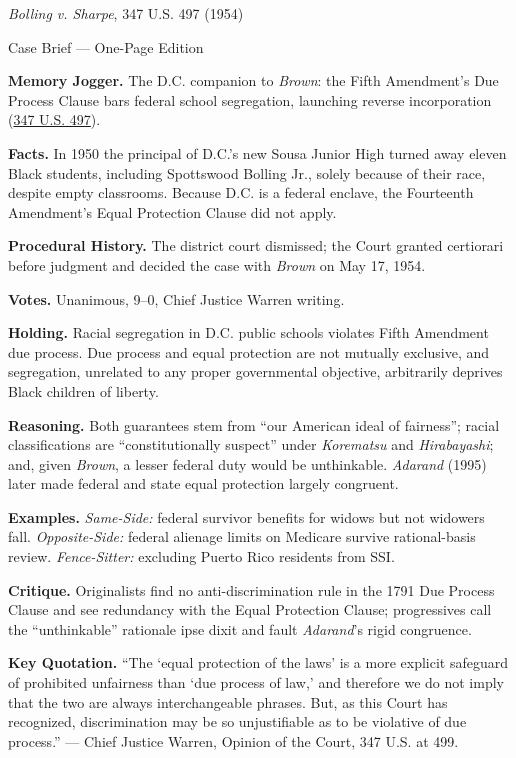 \documentclass[12pt]{article}
\begin{document}
\begin{center}
{\Large \textit{Bolling v. Sharpe}, 347 U.S. 497 (1954)\par}
\vspace{0.3em}
{\normalsize Case Brief --- One-Page Edition\par}
\end{center}

\textbf{Memory Jogger.} The D.C. companion to \textit{Brown}: the Fifth Amendment's Due Process Clause bars federal school segregation, launching reverse incorporation (\href{https://supreme.justia.com/cases/federal/us/347/497/}{347 U.S. 497}).

\textbf{Facts.} In 1950 the principal of D.C.'s new Sousa Junior High turned away eleven Black students, including Spottswood Bolling Jr., solely because of their race, despite empty classrooms. Because D.C. is a federal enclave, the Fourteenth Amendment's Equal Protection Clause did not apply.

\textbf{Procedural History.} The district court dismissed; the Court granted certiorari before judgment and decided the case with \textit{Brown} on May 17, 1954.

\textbf{Votes.} Unanimous, 9--0, Chief Justice Warren writing.

\textbf{Holding.} Racial segregation in D.C. public schools violates Fifth Amendment due process. Due process and equal protection are not mutually exclusive, and segregation, unrelated to any proper governmental objective, arbitrarily deprives Black children of liberty.

\textbf{Reasoning.} Both guarantees stem from ``our American ideal of fairness''; racial classifications are ``constitutionally suspect'' under \textit{Korematsu} and \textit{Hi\-ra\-ba\-ya\-shi}; and, given \textit{Brown}, a lesser federal duty would be unthinkable. \textit{Adarand} (1995) later made federal and state equal protection largely congruent.

\textbf{Examples.} \emph{Same-Side:} federal survivor benefits for widows but not widowers fall. \emph{Opposite-Side:} federal alienage limits on Medicare survive rational-basis review. \emph{Fence-Sitter:} excluding Puerto Rico residents from SSI.

\textbf{Critique.} Originalists find no anti-discrimination rule in the 1791 Due Process Clause and see redundancy with the Equal Protection Clause; progressives call the ``unthinkable'' rationale ipse dixit and fault \textit{Adarand}'s rigid congruence.

\textbf{Key Quotation.} ``The `equal protection of the laws' is a more explicit safeguard of prohibited unfairness than `due process of law,' and therefore we do not imply that the two are always interchangeable phrases. But, as this Court has recognized, discrimination may be so unjustifiable as to be violative of due process.'' --- Chief Justice Warren, Opinion of the Court, 347 U.S. at 499.
\end{document}
